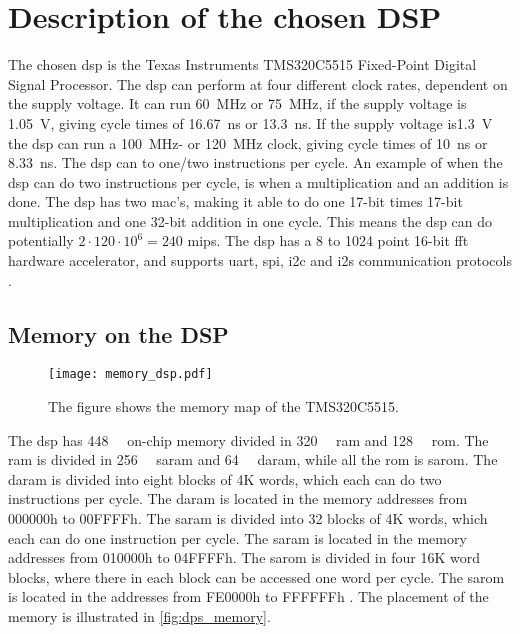 \section{Description of the chosen DSP}\label{sec:dsp_description}


The chosen \gls{dsp} is the Texas Instruments TMS320C5515 Fixed-Point Digital Signal Processor.
The \gls{dsp} can perform at four different clock rates, dependent on the supply voltage. It can run \SI{60}{\mega\hertz} or \SI{75}{\mega\hertz}, if the supply voltage is \SI{1.05}{\volt}, giving cycle times of \SI{16.67}{\nano\second} or \SI{13.3}{\nano\second}. If the supply voltage is\SI{1.3}{\volt} the \gls{dsp} can run a \SI{100}{\mega\hertz}- or \SI{120}{\mega\hertz} clock, giving cycle times of \SI{10}{\nano\second} or \SI{8.33}{\nano\second}. The \gls{dsp} can to one/two instructions per cycle. An example of when the \gls{dsp} can do two instructions per cycle, is when a multiplication and an addition is done. The \gls{dsp} has two \gls{mac}'s, making it able to do one 17-bit times 17-bit multiplication and one 32-bit addition in one cycle. This means the \gls{dsp} can do potentially $2 \cdot 120 \cdot 10^6 = 240$ \gls{mips}. The \gls{dsp} has a 8 to 1024 point 16-bit \gls{fft} hardware accelerator, and supports \gls{uart}, \gls{spi}, \gls{i2c} and \gls{i2s} communication protocols \cite{c55515}.
\subsection{Memory on the DSP}
\begin{figure}[h]
	\centering
		\texttt{[image: memory\_dsp.pdf]}
		\caption{The figure shows the memory map of the TMS320C5515.}
		\label{fig:dps_memory}
\end{figure}
The \gls{dsp} has \SI{448}{\kilo\byte} on-chip memory divided in \SI{320}{\kilo\byte} \gls{ram} and \SI{128}{\kilo\byte} \gls{rom}. The \gls{ram} is divided in \SI{256}{\kilo\byte} \gls{saram} and \SI{64}{\kilo\byte} \gls{daram}, while all the \gls{rom} is \gls{sarom}.
The \gls{daram} is divided into eight blocks of 4K words, which each can do two instructions per cycle. The \gls{daram} is located in the memory addresses from 000000h to 00FFFFh. The \gls{saram} is divided into 32 blocks of 4K words, which each can do one instruction per cycle. The \gls{saram} is located in the memory addresses from 010000h to 04FFFFh. The \gls{sarom} is divided in four 16K word blocks, where there in each block can be accessed one word per cycle. The \gls{sarom} is located in the addresses from FE0000h to FFFFFFh \cite{c5515}. The placement of the memory is illustrated in \autoref{fig:dps_memory}.

